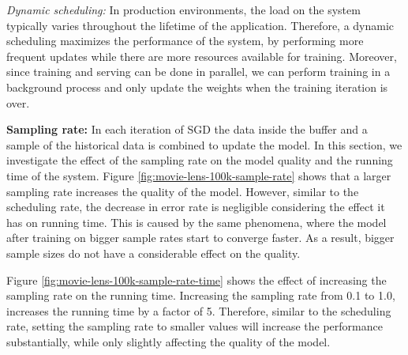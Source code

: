 \documentclass[10pt,conference,letterpaper]{IEEEtran}
\begin{document}
\textit{Dynamic scheduling:} In production environments, the load on the system typically varies throughout the lifetime of the application.
Therefore, a dynamic scheduling maximizes the performance of the system, by performing more frequent updates while there are more resources available for training. 
Moreover, since training and serving can be done in parallel, we can perform training in a background process and only update the weights when the training iteration is over. 

\textbf{Sampling rate:} In each iteration of SGD the data inside the buffer and a sample of the historical data is combined to update the model.
In this section, we investigate the effect of the sampling rate on the model quality and the running time of the system.
Figure \ref{fig:movie-lens-100k-sample-rate} shows that a larger sampling rate increases the quality of the model.
However, similar to the scheduling rate, the decrease in error rate is negligible considering the effect it has on running time. 
This is caused by the same phenomena, where the model after training on bigger sample rates start to converge faster.
As a result, bigger sample sizes do not have a considerable effect on the quality.
 
Figure \ref{fig:movie-lens-100k-sample-rate-time} shows the effect of increasing the sampling rate on the running time.
Increasing the sampling rate from 0.1 to 1.0, increases the running time by a factor of 5.
Therefore, similar to the scheduling rate, setting the sampling rate to smaller values will increase the performance substantially, while only slightly affecting the quality of the model.
\end{document}
